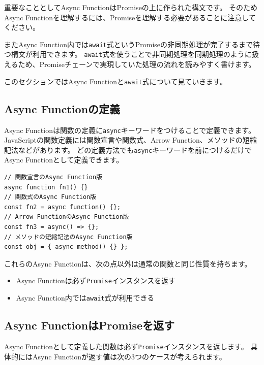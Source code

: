重要なこととしてAsync FunctionはPromiseの上に作られた構文です。
そのためAsync
Functionを理解するには、Promiseを理解する必要があることに注意してください。

またAsync
Function内では\texttt{await}式というPromiseの非同期処理が完了するまで待つ構文が利用できます。
\texttt{await}式を使うことで非同期処理を同期処理のように扱えるため、Promiseチェーンで実現していた処理の流れを読みやすく書けます。

このセクションではAsync
Functionと\texttt{await}式について見ていきます。

\hypertarget{declare-async-function}{%
\subsection{Async Functionの定義}\label{declare-async-function}}

Async
Functionは関数の定義に\texttt{async}キーワードをつけることで定義できます。
JavaScriptの関数定義には関数宣言や関数式、Arrow
Function、メソッドの短縮記法などがあります。
どの定義方法でも\texttt{async}キーワードを前につけるだけでAsync
Functionとして定義できます。

\begin{lstlisting}
// 関数宣言のAsync Function版
async function fn1() {}
// 関数式のAsync Function版
const fn2 = async function() {};
// Arrow FunctionのAsync Function版
const fn3 = async() => {};
// メソッドの短縮記法のAsync Function版
const obj = { async method() {} };
\end{lstlisting}

これらのAsync Functionは、次の点以外は通常の関数と同じ性質を持ちます。

\begin{itemize}
\item
  Async
  Functionは必ず\texttt{Promise}インスタンスを返す
\item
  Async Function内では\texttt{await}式が利用できる
\end{itemize}

\hypertarget{async-function-return-promise}{%
\subsection{Async
FunctionはPromiseを返す}\label{async-function-return-promise}}

Async
Functionとして定義した関数は必ず\texttt{Promise}インスタンスを返します。
具体的にはAsync Functionが返す値は次の3つのケースが考えられます。

